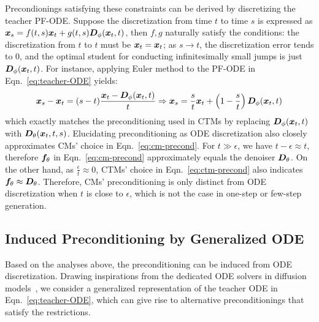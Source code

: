 Precondionings satisfying these constraints can be derived by discretizing the teacher PF-ODE. Suppose the discretization from time $t$ to time $s$ is expressed as $\bm{x}_s=f(t,s)\bm{x}_t+g(t,s)\bm{D}_\phi(\bm{x}_t,t)$, then $f,g$ naturally satisfy the conditions: the discretization from $t$ to $t$ must be $\bm{x}_t=\bm{x}_t$; as $s\rightarrow t$, the discretization error tends to 0, and the optimal student for conducting infinitesimally small jumps is just $\bm{D}_\phi(\bm{x}_t,t)$. For instance, applying Euler method to the PF-ODE in Eqn.~\eqref{eq:teacher-ODE} yields:
\begin{equation}
\label{eq:raw-ODE-discretization}
    \bm{x}_s-\bm{x}_t=(s-t)\frac{\bm{x}_t-\bm{D}_\phi(\bm{x}_t,t)}{t}\Rightarrow \bm{x}_s=\frac{s}{t}\bm{x}_t+\left(1-\frac{s}{t}\right)\bm{D}_\phi(\bm{x}_t,t)
\end{equation}
which exactly matches the preconditioning used in CTMs by replacing $\bm{D}_\phi(\bm{x}_t,t)$ with $\bm{D}_\theta(\bm{x}_t,t,s)$. Elucidating preconditioning as ODE discretization also closely approximates CMs' choice in Eqn.~\eqref{eq:cm-precond}. For $t\gg\epsilon$, we have $t-\epsilon\approx t$, therefore $\bm{f}_\theta$ in Eqn.~\eqref{eq:cm-precond} approximately equals the denoiser $\bm{D}_\theta$. On the other hand, as $\frac{\epsilon}{t}\approx 0$, CTMs' choice in Eqn.~\eqref{eq:ctm-precond} also indicates $\bm{f}_\theta\approx \bm{D}_\theta$. Therefore, CMs' preconditioning is only distinct from ODE discretization when $t$ is close to $\epsilon$, which is not the case in one-step or few-step generation.
\subsection{Induced Preconditioning by Generalized ODE}
Based on the analyses above, the preconditioning can be induced from ODE discretization. Drawing inspirations from the dedicated ODE solvers in diffusion models~\citep{lu2022dpm,zheng2023dpm}, we consider a generalized representation of the teacher ODE in Eqn.~\eqref{eq:teacher-ODE}, which can give rise to alternative preconditionings that satisfy the restrictions.

